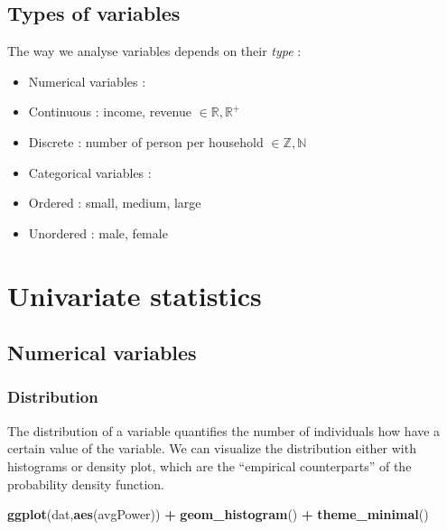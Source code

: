 \documentclass[
]{book}
\newenvironment{Shaded}{\begin{snugshade}}{\end{snugshade}}
\newcommand{\KeywordTok}[1]{\textcolor[rgb]{0.13,0.29,0.53}{\textbf{#1}}}
\newcommand{\NormalTok}[1]{#1}
\newcommand{\OperatorTok}[1]{\textcolor[rgb]{0.81,0.36,0.00}{\textbf{#1}}}
\newcommand{\StringTok}[1]{\textcolor[rgb]{0.31,0.60,0.02}{#1}}
\providecommand{\tightlist}{%
  \setlength{\itemsep}{0pt}\setlength{\parskip}{0pt}}
\begin{document}
\hypertarget{types-of-variables}{%
\subsection{Types of variables}\label{types-of-variables}}

The way we analyse variables depends on their \emph{type} :

\begin{itemize}
\tightlist
\item
  Numerical variables :
\item
  Continuous : income, revenue \(\in \mathbb{R} , \mathbb{R}^+\)
\item
  Discrete : number of person per household \(\in \mathbb{Z} , \mathbb{N}\)
\item
  Categorical variables :
\item
  Ordered : small, medium, large
\item
  Unordered : male, female
\end{itemize}

\hypertarget{univariate-statistics}{%
\section{Univariate statistics}\label{univariate-statistics}}

\hypertarget{numerical-variables}{%
\subsection{Numerical variables}\label{numerical-variables}}

\hypertarget{distribution}{%
\subsubsection{Distribution}\label{distribution}}

The distribution of a variable quantifies the number of individuals how have a certain value of the variable. We can visualize the distribution either with histograms or density plot, which are the ``empirical counterparts'' of the probability density function.

\begin{Shaded}
\begin{Highlighting}[]
\KeywordTok{ggplot}\NormalTok{(dat,}\KeywordTok{aes}\NormalTok{(avgPower)) }\OperatorTok{+}\StringTok{ }\KeywordTok{geom_histogram}\NormalTok{() }\OperatorTok{+}\StringTok{ }\KeywordTok{theme_minimal}\NormalTok{()}
\end{Highlighting}
\end{Shaded}
\end{document}
